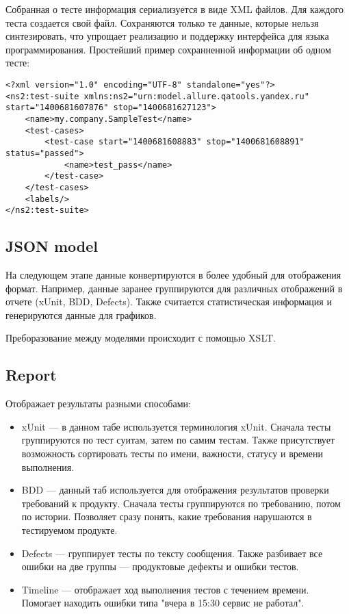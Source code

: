 Собранная о тесте информация сериализуется в виде XML файлов. Для каждого теста создается свой файл. Сохраняются только те данные, которые нельзя синтезировать, что упрощает реализацию и поддержку интерфейса для языка программирования. Простейший пример сохранненной информации об одном тесте:

\begin{lstlisting}[style=XML, caption=Пример простой XML-модели]
<?xml version="1.0" encoding="UTF-8" standalone="yes"?>
<ns2:test-suite xmlns:ns2="urn:model.allure.qatools.yandex.ru" start="1400681607876" stop="1400681627123">
    <name>my.company.SampleTest</name>
    <test-cases>
        <test-case start="1400681608883" stop="1400681608891" status="passed">
            <name>test_pass</name>
        </test-case>
    </test-cases>
    <labels/>
</ns2:test-suite>
\end{lstlisting}

\subsection{JSON model}

На следующем этапе данные конвертируются в более удобный для отображения формат. Например, данные заранее группируются для различных отображений в отчете (xUnit, BDD, Defects). Также считается статистическая информация и генерируются данные для графиков.

Преборазование между моделями происходит с помощью XSLT. 

\subsection{Report}

Отображает результаты разными способами: 

\begin{itemize}
\item xUnit --- в данном табе используется терминология xUnit. Сначала тесты группируются по тест суитам, затем по самим тестам. Также присутствует возможность сортировать тесты по имени, важности, статусу и времени выполнения.
\item BDD --- данный таб используется для отображения результатов проверки требований к продукту. Сначала тесты группируются по требованию, потом по истории. Позволяет сразу понять, какие требования нарушаются в тестируемом продукте.
\item Defects --- группирует тесты по тексту сообщения. Также разбивает все ошибки на две группы --- продуктовые дефекты и ошибки тестов. 
\item Timeline --- отображает ход выполнения тестов с течением времени. Помогает находить ошибки типа "вчера в 15:30 сервис не работал".
\end{itemize}

